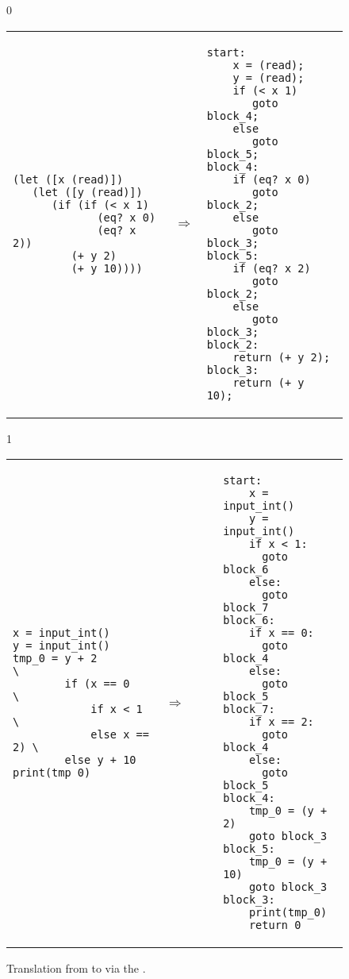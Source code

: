 \documentclass[7x10]{TimesAPriori_MIT}%
\def\racketEd{0}
\def\pythonEd{1}
\def\edition{1}
\newcommand{\pythonColor}[0]{}
\numberwithin{theorem}{chapter}
\numberwithin{definition}{chapter}
\numberwithin{equation}{chapter}
\begin{document}
\begin{figure}[tbp]
\begin{tcolorbox}[colback=white]
{\if\edition\racketEd        
\begin{tabular}{lll}
\begin{minipage}{0.4\textwidth}
\begin{lstlisting}
(let ([x (read)])
   (let ([y (read)])
      (if (if (< x 1)
             (eq? x 0)
             (eq? x 2))
         (+ y 2)
         (+ y 10))))
\end{lstlisting}
\end{minipage}
&
$\Rightarrow$
&
\begin{minipage}{0.55\textwidth}
\begin{lstlisting}
start:
    x = (read);
    y = (read);
    if (< x 1)
       goto block_4;
    else
       goto block_5;
block_4:
    if (eq? x 0)
       goto block_2;
    else
       goto block_3;
block_5:
    if (eq? x 2)
       goto block_2;
    else
       goto block_3;
block_2:
    return (+ y 2);
block_3:
    return (+ y 10);
\end{lstlisting}
\end{minipage}
\end{tabular} 
\fi}
{\if\edition\pythonEd\pythonColor
\begin{tabular}{lll}
\begin{minipage}{0.4\textwidth}
\begin{lstlisting}
x = input_int()
y = input_int()
tmp_0 = y + 2            \
        if (x == 0       \
            if x < 1     \
            else x == 2) \
        else y + 10
print(tmp_0)
\end{lstlisting}
\end{minipage}
&
$\Rightarrow\qquad$
&
\begin{minipage}{0.55\textwidth}
\begin{lstlisting}
start:
    x = input_int()
    y = input_int()
    if x < 1:
      goto block_6
    else:
      goto block_7
block_6:
    if x == 0:
      goto block_4
    else:
      goto block_5
block_7:
    if x == 2:
      goto block_4
    else:
      goto block_5
block_4:
    tmp_0 = (y + 2)
    goto block_3
block_5:
    tmp_0 = (y + 10)
    goto block_3
block_3:
    print(tmp_0)
    return 0
\end{lstlisting}
\end{minipage}
\end{tabular} 
\fi}
\end{tcolorbox}
\caption{Translation from \LangIfANF{} to \LangCIf{}
  via the .}
\label{fig:explicate-control-s1-38}
\end{figure}
\end{document}
